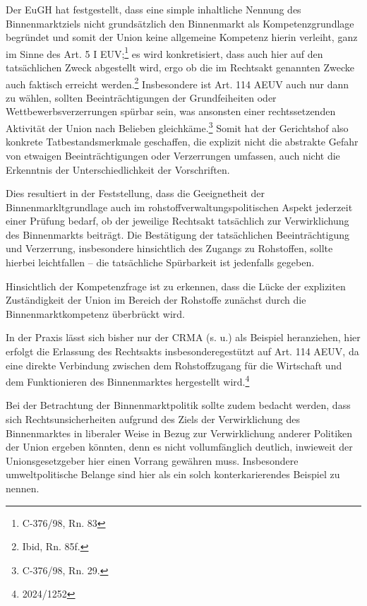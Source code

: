 \documentclass[12pt,a4paper,oneside]{book} %
\begin{document}
Der EuGH hat festgestellt, dass eine simple inhaltliche Nennung des Binnenmarktziels nicht grundsätzlich den Binnenmarkt als Kompetenzgrundlage begründet und somit der Union keine allgemeine Kompetenz hierin verleiht, ganz im Sinne des Art. 5 I EUV;\footnote{C-376/98, Rn. 83} es wird konkretisiert, dass auch hier auf den tatsächlichen Zweck abgestellt wird, ergo ob die im Rechtsakt genannten Zwecke auch faktisch erreicht werden.\footnote{Ibid, Rn. 85f.} Insbesondere ist Art. 114 AEUV auch nur dann zu wählen, sollten Beeinträchtigungen der Grundfeiheiten oder Wettbewerbsverzerrungen spürbar sein, was ansonsten einer rechtssetzenden Aktivität der Union nach Belieben gleichkäme.\footnote{C-376/98, Rn. 29.} Somit hat der Gerichtshof also konkrete Tatbestandsmerkmale geschaffen, die explizit nicht die abstrakte Gefahr von etwaigen Beeinträchtigungen oder Verzerrungen umfassen, auch nicht die Erkenntnis der Unterschiedlichkeit der Vorschriften.\autocite[hierzu ausführlich]{Callies, Berliner Beiträge 117, S. 16}

Dies resultiert in der Feststellung, dass die Geeignetheit der Binnenmarkltgrundlage auch im rohstoffverwaltungspolitischen Aspekt jederzeit einer Prüfung bedarf, ob der jeweilige Rechtsakt tatsächlich zur Verwirklichung des Binnenmarkts beiträgt. Die Bestätigung der tatsächlichen Beeinträchtigung und Verzerrung, insbesondere hinsichtlich des Zugangs zu Rohstoffen, sollte hierbei leichtfallen -- die tatsächliche Spürbarkeit ist jedenfalls gegeben. 

Hinsichtlich der Kompetenzfrage ist zu erkennen, dass die Lücke der expliziten Zuständigkeit der Union im Bereich der Rohstoffe zunächst durch die Binnenmarktkompetenz überbrückt wird.\autocite[Genauer: durch die Anknüpfung an die Warenverkehrsfreiheit]{Schorkopf, Europäische Rohstoffverwaltung, Rn. 2}
	
In der Praxis lässt sich bisher nur der CRMA (s. u.) als Beispiel heranziehen, hier erfolgt die Erlassung des Rechtsakts \grqq insbesondere\glqq gestützt auf Art. 114 AEUV, da eine direkte Verbindung zwischen dem Rohstoffzugang für die Wirtschaft und dem Funktionieren des Binnenmarktes hergestellt wird.\footnote{2024/1252}
	
Bei der Betrachtung der Binnenmarktpolitik sollte zudem bedacht werden, dass sich Rechtsunsicherheiten aufgrund des Ziels der Verwirklichung des Binnenmarktes in liberaler Weise in Bezug zur Verwirklichung anderer Politiken der Union ergeben könnten, denn es nicht vollumfänglich deutlich, inwieweit der Unionsgesetzgeber hier einen Vorrang gewähren muss.\autocite[§23 Rn 10]{classen_europarecht_2021} Insbesondere umweltpolitische Belange sind hier als ein solch konterkarierendes Beispiel zu nennen.
	
\end{document}
